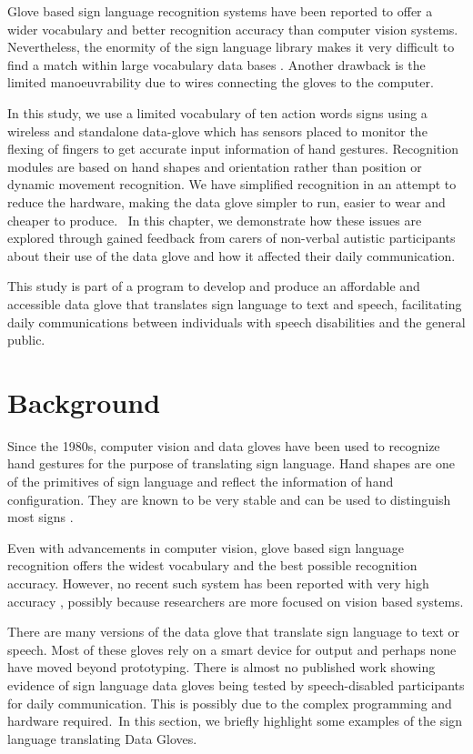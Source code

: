 Glove based sign language recognition systems have been reported to offer a wider vocabulary and better recognition accuracy than computer vision systems. Nevertheless, the enormity of the sign language library makes it very difficult to find a match within large vocabulary data bases \parencite{Premaratne2010}. Another drawback is the limited manoeuvrability due to wires connecting the gloves to the computer. 

In this study, we use a limited vocabulary of ten action words signs using a wireless and standalone data-glove which has sensors placed to monitor the flexing of fingers to get accurate input information of hand gestures. Recognition modules are based on hand shapes and orientation rather than position or dynamic movement recognition. We have simplified recognition in an attempt to reduce the hardware, making the data glove simpler to run, easier to wear and cheaper to produce. 
In this chapter, we demonstrate how these issues are explored through gained feedback from carers of non-verbal autistic participants about their use of the data glove and how it affected their daily communication. 

This study is part of a program to develop and produce an affordable and accessible data glove that translates sign language to text and speech, facilitating daily communications between individuals with speech disabilities and the general public. 

\section{Background}

Since the 1980s, computer vision and data gloves have been used to recognize hand gestures for the purpose of translating sign language. Hand shapes are one of the primitives of sign language and reflect the information of hand configuration. They are known to be very stable and can be used to distinguish most signs \parencite{Fang2003}. 

Even with advancements in computer vision, glove based sign language recognition offers the widest vocabulary and the best possible recognition accuracy. However, no recent such system has been reported with very high accuracy \parencite{Premaratne2010}, possibly because researchers are more focused on vision based systems. 

There are many versions of the data glove that translate sign language to text or speech. Most of these gloves rely on a smart device for output and perhaps none have moved beyond prototyping. There is almost no published work showing evidence of sign language data gloves being tested by speech-disabled participants for daily communication. This is possibly due to the complex programming and hardware required. In this section, we briefly highlight some examples of the sign language translating Data Gloves.

